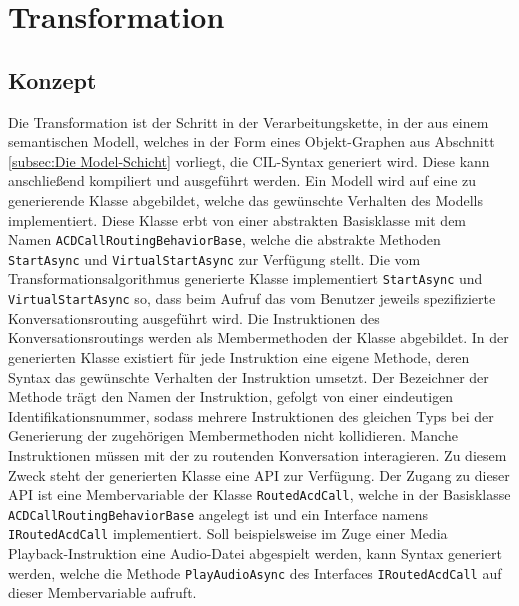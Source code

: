 \section{Transformation}
\label{sec:Transformation}

\subsection{Konzept}
\label{subsec:Konzept}
Die Transformation ist der Schritt in der Verarbeitungskette, in der aus einem semantischen Modell, welches in der Form eines Objekt-Graphen aus Abschnitt \ref{subsec:Die Model-Schicht} vorliegt, die CIL-Syntax generiert wird. Diese kann anschließend kompiliert und ausgeführt werden. Ein Modell wird auf eine zu generierende Klasse abgebildet, welche das gewünschte Verhalten des Modells implementiert. Diese Klasse erbt von einer abstrakten Basisklasse mit dem Namen \texttt{ACDCallRoutingBehaviorBase}, welche die abstrakte Methoden \texttt{StartAsync} und \texttt{VirtualStartAsync} zur Verfügung stellt. Die vom Transformationsalgorithmus generierte Klasse implementiert \texttt{Start\-Async} und \texttt{VirtualStartAsync} so, dass beim Aufruf das vom Benutzer jeweils spezifizierte Konversationsrouting ausgeführt wird.
\newline 
Die Instruktionen des Konversationsroutings werden als Membermethoden der Klasse abgebildet. In der generierten Klasse existiert für jede Instruktion eine eigene Methode, deren Syntax das gewünschte Verhalten der Instruktion umsetzt. Der Bezeichner der Methode trägt den Namen der Instruktion, gefolgt von einer eindeutigen Identifikationsnummer, sodass mehrere Instruktionen des gleichen Typs bei der Generierung der zugehörigen Membermethoden nicht kollidieren. Manche Instruktionen müssen mit der zu routenden Konversation interagieren. Zu diesem Zweck steht der generierten Klasse eine API zur Verfügung. Der Zugang zu  dieser API ist eine Membervariable der Klasse \texttt{RoutedAcdCall}, welche in der Basisklasse \texttt{ACDCallRoutingBehaviorBase} angelegt ist und ein Interface namens \texttt{IRoutedAcdCall} implementiert. Soll beispielsweise im Zuge einer Media Playback-Instruktion eine Audio-Datei abgespielt werden, kann Syntax generiert werden, welche die Methode \texttt{PlayAudioAsync} des Interfaces \texttt{IRoutedAcdCall} auf dieser Membervariable aufruft. 
\newline
